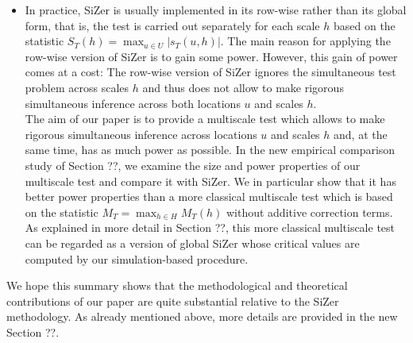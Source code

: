 \documentclass[a4paper,12pt]{article}
\begin{document}
\begin{itemize}[leftmargin=0.5cm]
\item In practice, SiZer is usually implemented in its row-wise rather than its global form, that is, the test is carried out separately for each scale $h$ based on the statistic $S_T(h) = \max_{u \in U} |s_T(u,h)|$. The main reason for applying the row-wise version of SiZer is to gain some power. However, this gain of power comes at a cost: The row-wise version of SiZer ignores the simultaneous test problem across scales $h$ and thus does not allow to make rigorous simultaneous inference across both locations $u$ and scales $h$. \\
The aim of our paper is to provide a multiscale test which allows to make rigorous simultaneous inference across locations $u$ and scales $h$ and, at the same time, has as much power as possible. In the new empirical comparison study of Section ??, we examine the size and power properties of our multiscale test and compare it with SiZer. We in particular show that it has better power properties than a more classical multiscale test which is based on the statistic $M_T = \max_{h \in H} M_T(h)$ without additive correction terms. As explained in more detail in Section ??, this more classical multiscale test can be regarded as a version of global SiZer whose critical values are computed by our simulation-based procedure.  

\end{itemize}

We hope this summary shows that the methodological and theoretical contributions of our paper are quite substantial relative to the SiZer methodology. As already mentioned above, more details are provided in the new Section ??.


\end{document}
